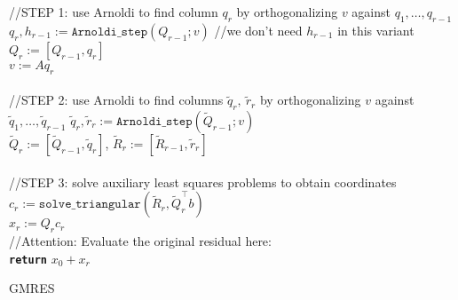 \begin{algorithm}
{	{\color{gray}//STEP 1: use Arnoldi to find column $q_r$ by orthogonalizing $v$ against $q_1,\ldots, q_{r-1}$ } \\
	$q_r, h_{r-1} := \texttt{Arnoldi\_step}(Q_{r-1}; v)$ {\color{gray}//we don't need $h_{r-1}$ in this variant}\\
	$Q_r := [Q_{r-1},q_r]$\\
	$v:= Aq_r$\\~\\
	{\color{gray}//STEP 2: use Arnoldi to find columns $\tilde{q}_r,~\widetilde{r}_r$ by orthogonalizing $v$ against $\tilde{q}_1,\ldots, \tilde{q}_{r-1}$ } 
	$\tilde{q}_r, \tilde{r}_r := \texttt{Arnoldi\_step}(\widetilde{Q}_{r-1}; v)$\\
	$\widetilde{Q}_r := [\widetilde{Q}_{r-1},\widetilde{q}_r]$, $\widetilde{R}_r := [\widetilde{R}_{r-1},\widetilde{r}_r]$\\~\\
	{\color{gray}//STEP 3: solve auxiliary least squares problems to obtain coordinates} \\
	$c_r := \texttt{solve\_triangular}(\widetilde{R}_r,\widetilde{Q}_r^\top b )$\\
	$x_r := Q_r c_r$	\\	
	{\color{gray}//Attention: Evaluate the original residual here:} \\
}
\texttt{\textbf{return}} $x_0 + x_r$
	\caption{GMRES}
	\label{gmres}
\end{algorithm}